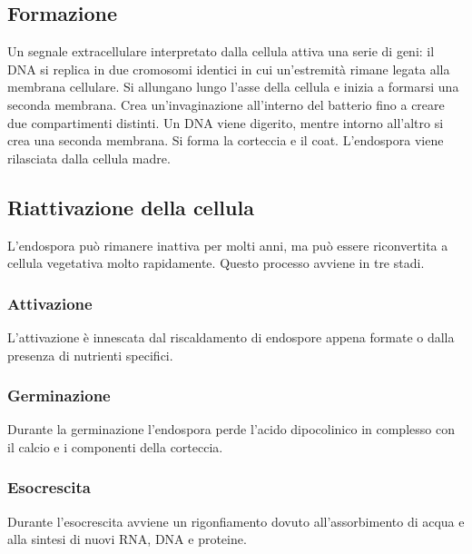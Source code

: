 	\subsection{Formazione}
	Un segnale extracellulare interpretato dalla cellula attiva una serie di geni: il DNA si replica in due cromosomi identici in cui un'estremit\`a rimane legata alla membrana cellulare.
	Si allungano lungo l'asse della cellula e inizia a formarsi una seconda membrana.
	Crea un'invaginazione all'interno del batterio fino a creare due compartimenti distinti.
	Un DNA viene digerito, mentre intorno all'altro si crea una seconda membrana.
	Si forma la corteccia e il coat.
	L'endospora viene rilasciata dalla cellula madre.

	\subsection{Riattivazione della cellula}
	L'endospora pu\`o rimanere inattiva per molti anni, ma pu\`o essere riconvertita a cellula vegetativa molto rapidamente.
	Questo processo avviene in tre stadi.

		\subsubsection{Attivazione}
		L'attivazione \`e innescata dal riscaldamento di endospore appena formate o dalla presenza di nutrienti specifici.
		
		\subsubsection{Germinazione}
		Durante la germinazione l'endospora perde l'acido dipocolinico in complesso con il calcio e i componenti della corteccia.

		\subsubsection{Esocrescita}
		Durante l'esocrescita avviene un rigonfiamento dovuto all'assorbimento di acqua e alla sintesi di nuovi RNA, DNA e proteine.
